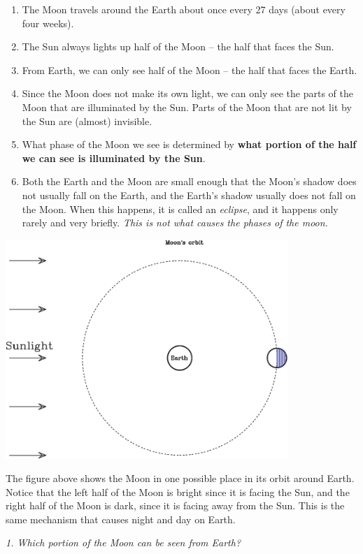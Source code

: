 \documentclass[11pt]{article}
\begin{document}
\begin{enumerate}
\item The Moon travels around the Earth about once every 27 days (about every four weeks).
\item The Sun always lights up half of the Moon -- the half that faces the Sun.
\item From Earth, we can only see half of the Moon -- the half that faces the Earth.
\item Since the Moon does not make its own light, we can only see the parts of the Moon that are illuminated by the Sun. Parts of the Moon that are not lit by the Sun are (almost) invisible.
\item What phase of the Moon we see is determined by {\bf what portion of the half we can see is illuminated by the Sun}.
\item Both the Earth and the Moon are small enough that the Moon's shadow does not usually fall on the Earth, and the Earth's
shadow usually does not fall on the Moon. When this happens, it is called an {\it eclipse}, and it happens only rarely and very 
briefly. {\it This is not what causes the phases of the moon.}
\end{enumerate}

\newpage
\includegraphics[width=0.8\textwidth]{moon-diagram-full-crop.pdf}


	The figure above shows the Moon in one possible place in its orbit around Earth. Notice that the left half of the Moon is
	bright since it is facing the Sun, and the right half of the Moon is dark, since it is facing away from the Sun. This is the same mechanism that causes night and day on Earth.

{\it 1. Which portion of the Moon can be seen from Earth? }
\end{document}
